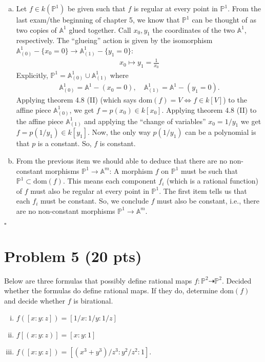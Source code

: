 \documentclass[12pt]{article}
\newcommand{\A}{\mathbb{A}}
\newcommand{\f}[2]{\frac{#1}{#2}}
\begin{document}
\begin{enumerate}[(a)]
	\item Let $f \in k(\mathbb{P}^1)$ be given such that $f$ is regular at every point in $\mathbb{P}^1$. From the last exam/the beginning of chapter 5, we know that $\mathbb{P}^1$ can be thought of as two copies of $\A^1$ glued together. Call $x_0,y_1$ the coordinates of the two $\A^1$, respectively. The ``glueing'' action is given by the isomorphism $\A^1_{(0)} - \{x_0 = 0\} \to \A^1_{(1)}-\{y_1=0\}$:
	\begin{align*}
	x_0 \mapsto y_1 = \f{1}{x_0}
	\end{align*}
	Explicitly, $\mathbb{P}^1 = \A^1_{(0)} \cup \A^1_{(1)}$ where
	\begin{align*}
	\A^1_{(0)} = \A^1 - (x_0 = 0), \quad \A^1_{(1)} = \A^1 - (y_1 =0).
	\end{align*} 
	Applying theorem 4.8 (II) (which says $\mbox{dom}(f) = V \iff f \in k[V]$) to the affine piece $\A^1_{(0)}$, we get $f = p(x_0) \in k[x_0]$. Applying theorem 4.8 (II) to the affine piece $\A^1_{(1)}$ and applying the ``change of variables'' $x_0 = 1/y_1$ we get $f = p(1/y_1) \in k[y_1]$. Now, the only way $p(1/y_1)$ can be a polynomial is that $p$ is a constant. So, $f$ is constant. 
	
	
	
	\item  From the previous item we should able to deduce that there are no non-constant morphisms $\mathbb{P}^1 \to \A^m$: A morphism $f$ on $\mathbb{P}^1$ must be such that $\mathbb{P}^1 \subset \mbox{dom}(f) $. This means each component $f_i$ (which is a rational function) of $f$ must also be regular at every point in $\mathbb{P}^1$. The first item tells us that each $f_i$ must be constant. So, we conclude $f$ must also be constant, i.e., there are no non-constant morphisms $\mathbb{P}^1 \to \A^m$. 	
\end{enumerate}
\hfill $\square$


















\newpage





\section*{Problem 5 \small{(20 pts)}} 
Below are three formulas that possibly define rational maps $f: \mathbb{P}^2 \dashrightarrow \mathbb{P}^2$. Decided whether the formulas do define rational maps. If they do, determine $\mbox{dom}(f)$ and decide whether $f$ is birational. 
\begin{enumerate}[(i)]
	\item $f([x:y:z]) = [1/x:1/y:1/z]$
	\item $f[(x:y:z)] = [x:y:1]$
	\item $f([x:y:z]) = [(x^3+y^3)/z^3 : y^2/z^2 : 1]$.
\end{enumerate}
\end{document}
